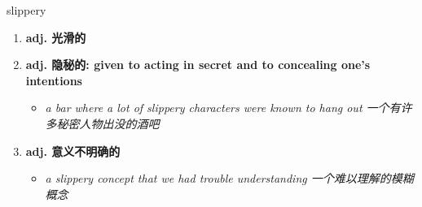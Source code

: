 
\begin{frame}
{\huge slippery}
\begin{center}
\begin{enumerate}\Large
  \item \textbf{adj. 光滑的}
  \item \textbf{adj. 隐秘的: given to acting in secret and to concealing one's intentions}
  \begin{itemize}
    \item \em{\Large{a bar where a lot of slippery characters were known to hang out 一个有许多秘密人物出没的酒吧}}
  \end{itemize}
  \item \textbf{adj. 意义不明确的}
  \begin{itemize}
    \item \em{\Large{a slippery concept that we had trouble understanding 一个难以理解的模糊概念}}
  \end{itemize}
\end{enumerate}
\end{center}
\end{frame}

